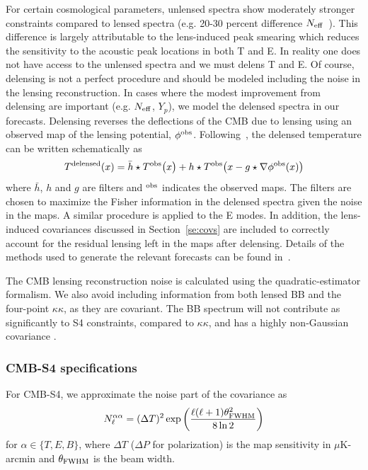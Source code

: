 For certain cosmological parameters, unlensed spectra show moderately stronger constraints compared to lensed spectra (e.g. 20-30 percent difference $N_{\rm eff}$~\cite{Baumann:2015rya}).  This difference is largely attributable to the lens-induced peak smearing which reduces the sensitivity to the acoustic peak locations in both T and E.  In reality one does not have access to the unlensed spectra and we must delens T and E.  Of course, delensing is not a perfect procedure and should be modeled including the noise in the lensing reconstruction.  In cases where the modest improvement from delensing are important (e.g. $N_\mathrm{eff}$, $Y_p$), we model the delensed spectra in our forecasts.  Delensing reverses the deflections of the CMB due to lensing using an observed map of the lensing potential, $\phi^{\rm obs}$.  Following~\cite{Green:2016}, the delensed temperature can be written schematically as
\begin{equation}
T^{\rm delensed}(x) = \bar h \star T^{\rm obs}\big(x \big) + h \star T^{\rm obs}\big(x-g\star \nabla \phi^{\rm obs}(x)\big)
\end{equation}
where $\bar h$, $h$ and $g$ are filters and $^{\rm obs}$ indicates the observed maps.  The filters are chosen to maximize the Fisher information in the delensed spectra given the noise in the maps.  A similar procedure is applied to the E modes.  In addition, the lens-induced covariances discussed in Section~\ref{se:covs} are included to correctly account for the residual lensing left in the maps after delensing.  Details of the methods used to generate the relevant forecasts can be found in~\cite{Green:2016}.

The CMB lensing reconstruction noise is calculated using the \cite{Hu:2001kj} quadratic-estimator formalism.  We also avoid including information from both lensed BB and the four-point $\kappa \kappa$, as they are covariant. The BB spectrum will not contribute as significantly to S4 constraints, compared to $\kappa \kappa$, and has a highly non-Gaussian covariance \cite{BenoitLevy:2012va}. 

\subsubsection{CMB-S4 specifications}
For CMB-S4, we approximate the noise part of the covariance as
%
\begin{equation}
N^{\alpha \alpha}_\ell = (\Delta T)^2 \exp \left( \frac{\ell(\ell + 1) \theta^2_{\rm FWHM}}{8 \ln 2} \right)
\end{equation}
%
for $\alpha \in \{T, E, B\}$, where $\Delta T$ ($\Delta P$ for polarization) is the map sensitivity in $\mu$K-arcmin and $\theta_{\rm FWHM}$ is the beam width. 

